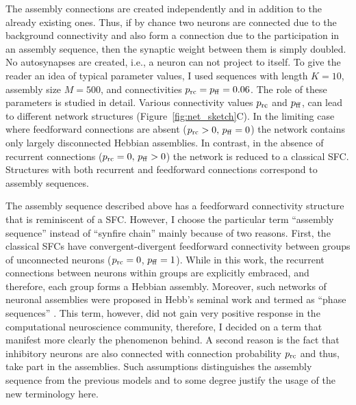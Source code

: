     The assembly connections are created independently and in addition to the already existing ones. Thus, if by chance two neurons are connected due to the background connectivity and also form a connection due to the participation in an assembly sequence, then the synaptic weight between them is simply doubled. No autosynapses are created, i.e., a neuron can not project to itself. To give the reader an idea of typical parameter values, I used sequences with length $K=10$, assembly size $M=500$, and connectivities $p_{\rm rc}=p_{\rm ff}=0.06$. The role of these parameters is studied in detail. Various connectivity values $p_{\rm rc}$ and $p_{\rm ff}$, can lead to different network structures (Figure~\ref{fig:net_sketch}C). In the limiting case where feedforward connections are absent ($ p_{\rm rc}>0,\, p_{\rm ff}=0$) the network contains only largely disconnected Hebbian assemblies. In contrast, in the absence of recurrent connections ($p_{\rm rc}=0,\, p_{\rm ff}>0$) the network is reduced to a classical SFC. Structures with both recurrent and feedforward connections correspond to assembly sequences.

    The assembly sequence described above has a feedforward connectivity structure that is reminiscent of a SFC. However, I choose the particular term ``assembly sequence'' instead of ``synfire chain'' mainly because of two reasons. First, the classical SFCs \citep{Abeles91, Diesmann99} have convergent-divergent feedforward connectivity between groups of unconnected neurons ($p_{\rm rc}=0$, $p_{\rm ff}=1$). While in this work, the recurrent connections between neurons within groups are explicitly embraced, and therefore, each group forms a Hebbian assembly. Moreover, such networks of neuronal assemblies were proposed in Hebb's seminal work and termed as ``phase sequences'' \citep{Hebb49}. This term, however, did not gain very positive response in the computational neuroscience community, therefore, I decided on a term that manifest more clearly the phenomenon behind. A second reason is the fact that inhibitory neurons are also connected with connection probability $p_{\rm rc}$ and thus, take part in the assemblies. Such assumptions distinguishes the assembly sequence from the previous models and to some degree justify the usage of the new terminology here.
    
